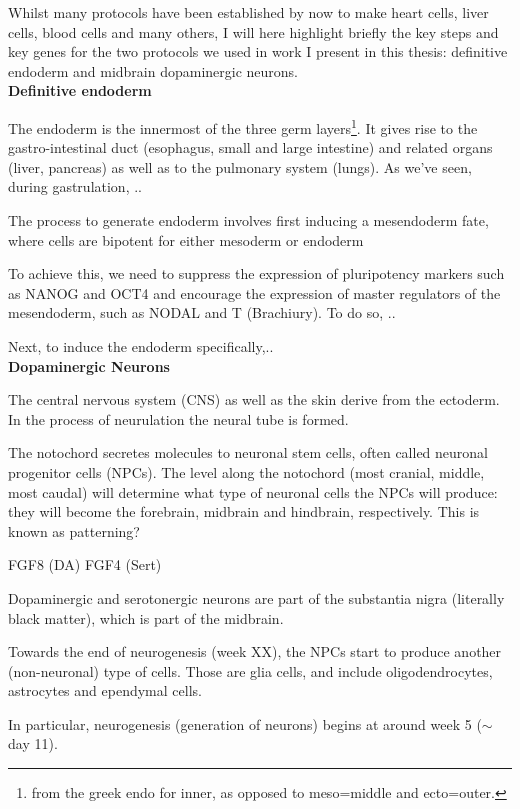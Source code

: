 Whilst many protocols have been established by now to make heart cells, liver cells, blood cells and many others, I will here highlight briefly the key steps and key genes for the two protocols we used in work I present in this thesis: definitive endoderm and midbrain dopaminergic neurons.\\

\textbf{Definitive endoderm}

The endoderm is the innermost of the three germ layers\footnote{from the greek endo for inner, as opposed to meso=middle and ecto=outer.}.
It gives rise to the gastro-intestinal duct (esophagus, small and large intestine) and related organs (liver, pancreas) as well as to the pulmonary system (lungs).
As we've seen, during gastrulation, ..

The process to generate endoderm involves first inducing a mesendoderm fate, where cells are bipotent for either mesoderm or endoderm

To achieve this, we need to suppress the expression of pluripotency markers such as NANOG and OCT4 and encourage the expression of master regulators of the mesendoderm, such as NODAL and T (Brachiury).
To do so, ..

Next, to induce the endoderm specifically,..\\

\textbf{Dopaminergic Neurons}

The central nervous system (CNS) as well as the skin derive from the ectoderm.
In the process of neurulation the 
neural tube
is formed.

The notochord secretes molecules to neuronal stem cells, often called neuronal progenitor cells (NPCs).  
The level along the notochord (most cranial, middle, most caudal) will determine what type of neuronal cells the NPCs will produce: they will become the forebrain, midbrain and hindbrain, respectively.
This is known as patterning?

FGF8 (DA)
FGF4 (Sert)

Dopaminergic and serotonergic neurons are part of the substantia nigra (literally black matter), which is part of the midbrain.

Towards the end of neurogenesis (week XX), the NPCs start to produce another (non-neuronal) type of cells.
Those are glia cells, and include oligodendrocytes, astrocytes and ependymal cells.


In particular, neurogenesis (generation of neurons) begins at around week 5 ($\sim$ day 11).

